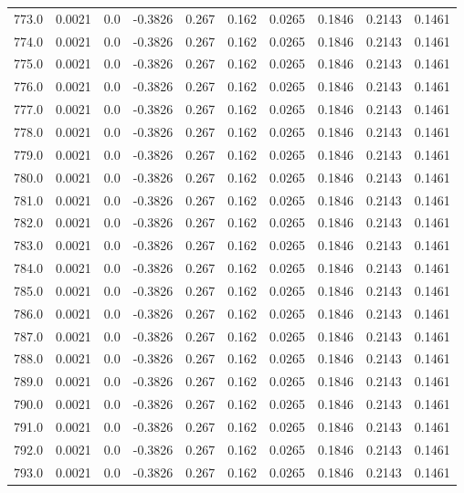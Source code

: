 \begin{longtable}{lrrrrrrrrr}
773.0 & 0.0021 & 0.0 & -0.3826 & 0.267 & 0.162 & 0.0265 & 0.1846 & 0.2143 & 0.1461 \\
774.0 & 0.0021 & 0.0 & -0.3826 & 0.267 & 0.162 & 0.0265 & 0.1846 & 0.2143 & 0.1461 \\
775.0 & 0.0021 & 0.0 & -0.3826 & 0.267 & 0.162 & 0.0265 & 0.1846 & 0.2143 & 0.1461 \\
776.0 & 0.0021 & 0.0 & -0.3826 & 0.267 & 0.162 & 0.0265 & 0.1846 & 0.2143 & 0.1461 \\
777.0 & 0.0021 & 0.0 & -0.3826 & 0.267 & 0.162 & 0.0265 & 0.1846 & 0.2143 & 0.1461 \\
778.0 & 0.0021 & 0.0 & -0.3826 & 0.267 & 0.162 & 0.0265 & 0.1846 & 0.2143 & 0.1461 \\
779.0 & 0.0021 & 0.0 & -0.3826 & 0.267 & 0.162 & 0.0265 & 0.1846 & 0.2143 & 0.1461 \\
780.0 & 0.0021 & 0.0 & -0.3826 & 0.267 & 0.162 & 0.0265 & 0.1846 & 0.2143 & 0.1461 \\
781.0 & 0.0021 & 0.0 & -0.3826 & 0.267 & 0.162 & 0.0265 & 0.1846 & 0.2143 & 0.1461 \\
782.0 & 0.0021 & 0.0 & -0.3826 & 0.267 & 0.162 & 0.0265 & 0.1846 & 0.2143 & 0.1461 \\
783.0 & 0.0021 & 0.0 & -0.3826 & 0.267 & 0.162 & 0.0265 & 0.1846 & 0.2143 & 0.1461 \\
784.0 & 0.0021 & 0.0 & -0.3826 & 0.267 & 0.162 & 0.0265 & 0.1846 & 0.2143 & 0.1461 \\
785.0 & 0.0021 & 0.0 & -0.3826 & 0.267 & 0.162 & 0.0265 & 0.1846 & 0.2143 & 0.1461 \\
786.0 & 0.0021 & 0.0 & -0.3826 & 0.267 & 0.162 & 0.0265 & 0.1846 & 0.2143 & 0.1461 \\
787.0 & 0.0021 & 0.0 & -0.3826 & 0.267 & 0.162 & 0.0265 & 0.1846 & 0.2143 & 0.1461 \\
788.0 & 0.0021 & 0.0 & -0.3826 & 0.267 & 0.162 & 0.0265 & 0.1846 & 0.2143 & 0.1461 \\
789.0 & 0.0021 & 0.0 & -0.3826 & 0.267 & 0.162 & 0.0265 & 0.1846 & 0.2143 & 0.1461 \\
790.0 & 0.0021 & 0.0 & -0.3826 & 0.267 & 0.162 & 0.0265 & 0.1846 & 0.2143 & 0.1461 \\
791.0 & 0.0021 & 0.0 & -0.3826 & 0.267 & 0.162 & 0.0265 & 0.1846 & 0.2143 & 0.1461 \\
792.0 & 0.0021 & 0.0 & -0.3826 & 0.267 & 0.162 & 0.0265 & 0.1846 & 0.2143 & 0.1461 \\
793.0 & 0.0021 & 0.0 & -0.3826 & 0.267 & 0.162 & 0.0265 & 0.1846 & 0.2143 & 0.1461 \\

\end{longtable}
